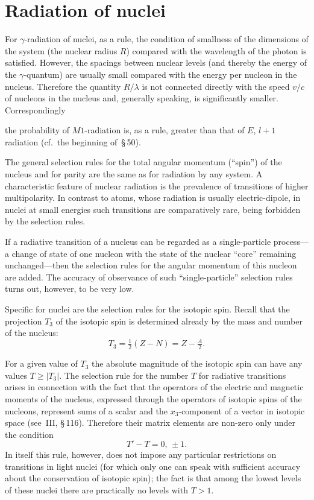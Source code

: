\section{Radiation of nuclei}

For $\gamma$-radiation of nuclei, as a rule, the condition of smallness of the dimensions of the system (the nuclear radius $R$) compared with the wavelength of the photon is satisfied. However, the spacings between nuclear levels (and thereby the energy of the $\gamma$-quantum) are usually small compared with the energy per nucleon in the nucleus. Therefore the quantity $R/\lambda$ is not connected directly with the speed $v/c$ of nucleons in the nucleus and, generally speaking, is significantly smaller. Correspondingly

the probability of $M1$-radiation is, as a rule, greater than that of $E$, $l + 1$ radiation (cf.\ the beginning of~\S\,50).

The general selection rules for the total angular momentum (``spin'') of the nucleus and for parity are the same as for radiation by any system. A characteristic feature of nuclear radiation is the prevalence of transitions of higher multipolarity. In contrast to atoms, whose radiation is usually electric-dipole, in nuclei at small energies such transitions are comparatively rare, being forbidden by the selection rules.

If a radiative transition of a nucleus can be regarded as a single-particle process---a change of state of one nucleon with the state of the nuclear ``core'' remaining unchanged---then the selection rules for the angular momentum of this nucleon are added. The accuracy of observance of such ``single-particle'' selection rules turns out, however, to be very low.

Specific for nuclei are the selection rules for the isotopic spin. Recall that the projection $T_3$ of the isotopic spin is determined already by the mass and number of the nucleus:
\[
T_3 = \tfrac{1}{2}(Z - N) = Z - \tfrac{A}{2}.
\]

For a given value of $T_3$ the absolute magnitude of the isotopic spin can have any values $T \geqslant |T_3|$. The selection rule for the number $T$ for radiative transitions arises in connection with the fact that the operators of the electric and magnetic moments of the nucleus, expressed through the operators of isotopic spins of the nucleons, represent sums of a scalar and the $x_3$-component of a vector in isotopic space (see~III, \S\,116). Therefore their matrix elements are non-zero only under the condition
\begin{equation}
T' - T = 0,\,\pm 1.
\tag{55.1}
\end{equation}
In itself this rule, however, does not impose any particular restrictions on transitions in light nuclei (for which only one can speak with sufficient accuracy about the conservation of isotopic spin); the fact is that among the lowest levels of these nuclei there are practically no levels with $T > 1$.

